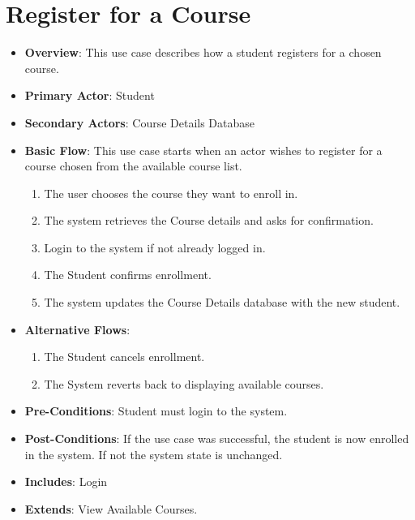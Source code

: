 \documentclass[12pt, a4]{report}
\begin{document}
\section{Register for a Course}
\begin{itemize}
    \item \textbf{Overview}: This use case describes how a student registers for a chosen course.
    \item \textbf{Primary Actor}: Student
    \item \textbf{Secondary Actors}: Course Details Database
    \item \textbf{Basic Flow}: This use case starts when an actor wishes to register for a course chosen from the available course list.
        \begin{enumerate}
            \item The user chooses the course they want to enroll in.
            \item The system retrieves the Course details and asks for confirmation.
            \item Login to the system if not already logged in.
            \item The Student confirms enrollment.
            \item The system updates the Course Details database with the new student.
        \end{enumerate}
    \item \textbf{Alternative Flows}:
        \begin{enumerate}
            \item The Student cancels enrollment.
            \item The System reverts back to displaying available courses.
        \end{enumerate}
    \item \textbf{Pre-Conditions}: Student must login to the system.
    \item \textbf{Post-Conditions}: If the use case was successful, the student is now enrolled in the system. If not the system state is unchanged.
    \item \textbf{Includes}: Login
    \item \textbf{Extends}: View Available Courses.
\end{itemize}

\end{document}
